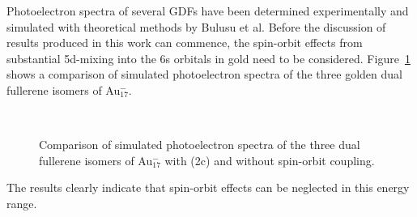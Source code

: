 Photoelectron spectra of several \acp{GDF} have been determined experimentally
and simulated with theoretical methods by Bulusu et
al.\autocite{Bulusu_Evidencehollowgolden_2006} Before the discussion of results
produced in this work can commence, the spin-orbit effects from substantial
5d-mixing into the 6s orbitals in gold need to be considered.
Figure~\ref{fig:photoSOAu17} shows a comparison of simulated photoelectron
spectra of the three golden dual fullerene isomers of Au$_{17}^-$.
%
\begin{figure}[htb]\centering
	\hfill
	\\
	\caption{Comparison of simulated photoelectron spectra of the three dual fullerene isomers of Au$_{17}^-$ with (2c) and without spin-orbit coupling.} 
	\label{fig:photoSOAu17}
\end{figure}
%
The results clearly indicate that spin-orbit effects can be neglected in this
energy range.

